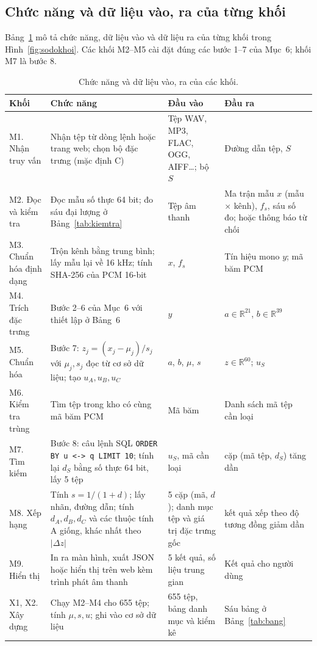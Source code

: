 \documentclass[11pt,a4paper]{article}
\begin{document}
\subsection{Chức năng và dữ liệu vào, ra của từng khối}
Bảng~\ref{tab:khoi} mô tả chức năng, dữ liệu vào và dữ liệu ra của từng khối trong Hình~\ref{fig:sodokhoi}. Các khối M2--M5 cài đặt đúng các bước 1--7 của Mục~6; khối M7 là bước 8.
\begin{table}[htbp]
\centering\footnotesize
\caption{Chức năng và dữ liệu vào, ra của các khối.}\label{tab:khoi}
\begin{tabularx}{\textwidth}{>{\raggedright}p{}>{\raggedright}X>{\raggedright}p{}>{\raggedright\arraybackslash}p{}}
\toprule
Khối & Chức năng & Đầu vào & Đầu ra\\\midrule
M1. Nhận truy vấn & Nhận tệp từ dòng lệnh hoặc trang web; chọn bộ đặc trưng (mặc định C) & Tệp WAV, MP3, FLAC, OGG, AIFF\ldots; bộ $S$ & Đường dẫn tệp, $S$\\
M2. Đọc và kiểm tra & Đọc mẫu số thực 64 bit; đo sáu đại lượng ở Bảng~\ref{tab:kiemtra} & Tệp âm thanh & Ma trận mẫu $x$ (mẫu $\times$ kênh), $f_s$, sáu số đo; hoặc thông báo từ chối\\
M3. Chuẩn hóa định dạng & Trộn kênh bằng trung bình; lấy mẫu lại về 16 kHz; tính SHA-256 của PCM 16-bit & $x$, $f_s$ & Tín hiệu mono $y$; mã băm PCM\\
M4. Trích đặc trưng & Bước 2--6 của Mục~6 với thiết lập ở Bảng~6 & $y$ & $a\in\mathbb R^{21}$, $b\in\mathbb R^{39}$\\
M5. Chuẩn hóa & Bước 7: $z_j=(x_j-\mu_j)/s_j$ với $\mu_j, s_j$ đọc từ cơ sở dữ liệu; tạo $u_A,u_B,u_C$ & $a$, $b$, $\mu$, $s$ & $z\in\mathbb R^{60}$; $u_S$\\
M6. Kiểm tra trùng & Tìm tệp trong kho có cùng mã băm PCM & Mã băm & Danh sách mã tệp cần loại\\
M7. Tìm kiếm & Bước 8: câu lệnh SQL \texttt{ORDER BY u <-> q LIMIT 10}; tính lại $d_S$ bằng số thực 64 bit, lấy 5 tệp & $u_S$, mã cần loại & 5 cặp (mã tệp, $d_S$) tăng dần\\
M8. Xếp hạng & Tính $s=1/(1+d)$; lấy nhãn, đường dẫn; tính $d_A,d_B,d_C$ và các thuộc tính A giống, khác nhất theo $|\Delta z|$ & 5 cặp (mã, $d$); danh mục tệp và giá trị đặc trưng gốc & 5 kết quả xếp theo độ tương đồng giảm dần\\
M9. Hiển thị & In ra màn hình, xuất JSON hoặc hiển thị trên web kèm trình phát âm thanh & 5 kết quả, số liệu trung gian & Kết quả cho người dùng\\\midrule
X1, X2. Xây dựng & Chạy M2--M4 cho 655 tệp; tính $\mu,s,u$; ghi vào cơ sở dữ liệu & 655 tệp, bảng danh mục và kiểm kê & Sáu bảng ở Bảng~\ref{tab:bang}\\\bottomrule
\end{tabularx}
\end{table}
\end{document}
